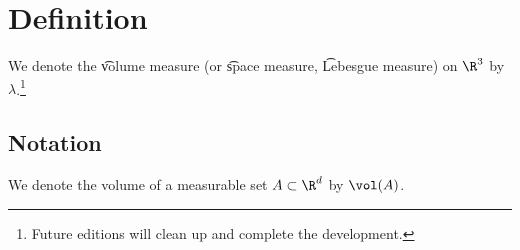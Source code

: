 
\section*{Definition}

We denote the \t{volume measure} (or \t{space measure}, \t{Lebesgue measure}) on $\R ^3$ by $\lambda $.\footnote{Future editions will clean up and complete the development.}

\subsection*{Notation}

We denote the volume of a measurable set $A \subset \R ^d$ by $\vol(A)$.

\blankpage
